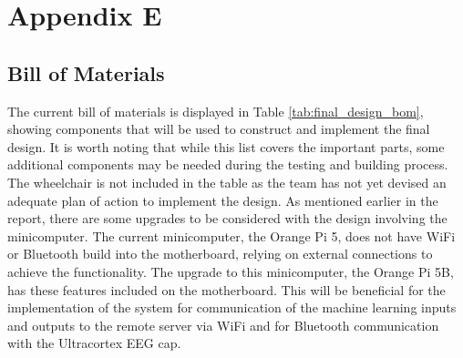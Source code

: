 \documentclass[conference]{IEEEtran}
\begin{document}
\setcounter{section}{5}
\renewcommand{\thesubsection}{E.\Alph{subsection}}
\section*{\textbf{Appendix E}}
        \setcounter{figure}{0}
        \renewcommand{\thefigure}{E.\arabic{figure}}
        \setcounter{table}{0}
        \renewcommand{\thetable}{E.\arabic{table}}
        \setcounter{subsection}{0}
        
    \subsection{Bill of Materials}
    The current bill of materials is displayed in Table \ref{tab:final_design_bom}, showing components that will be used to construct and implement the final design. It is worth noting that while this list covers the important parts, some additional components may be needed during the testing and building process. The wheelchair is not included in the table as the team has not yet devised an adequate plan of action to implement the design. As mentioned earlier in the report, there are some upgrades to be considered with the design involving the minicomputer. The current minicomputer, the Orange Pi 5, does not have WiFi or Bluetooth build into the motherboard, relying on external connections to achieve the functionality. The upgrade to this minicomputer, the Orange Pi 5B, has these features included on the motherboard. This will be beneficial for the implementation of the system for communication of the machine learning inputs and outputs to the remote server via WiFi and for Bluetooth communication with the Ultracortex EEG cap. 
\end{document}
